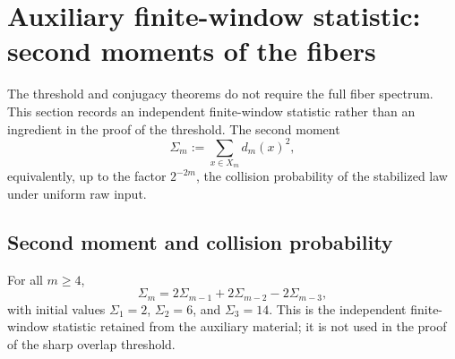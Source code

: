 \section{Auxiliary finite-window statistic: second moments of the fibers}\label{sec:fiber-spectrum}

The threshold and conjugacy theorems do not require the full fiber spectrum.
This section records an independent finite-window statistic rather than an
ingredient in the proof of the threshold. The second moment
\[
\Sigma_m:=\sum_{x\in X_m}d_m(x)^2,
\]
equivalently, up to the factor $2^{-2m}$, the collision probability of the stabilized law under uniform raw input.

\subsection{Second moment and collision probability}\label{sec:fiber-collision}

\begin{proposition}\label{prop:second-moment-recurrence}
For all $m\ge4$,
\begin{equation}\label{eq:sigma-recurrence}
\Sigma_m=2\Sigma_{m-1}+2\Sigma_{m-2}-2\Sigma_{m-3},
\end{equation}
with initial values $\Sigma_1=2$, $\Sigma_2=6$, and $\Sigma_3=14$.
This is the independent finite-window statistic retained from the auxiliary
material; it is not used in the proof of the sharp overlap threshold.
\end{proposition}

